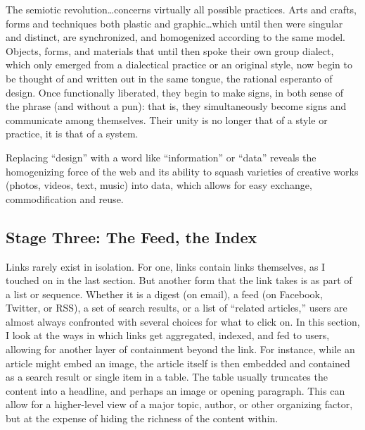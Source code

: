 The semiotic revolution…concerns virtually all possible practices. Arts and crafts, forms and techniques both plastic and graphic…which until then were singular and distinct, are synchronized, and homogenized according to the same model. Objects, forms, and materials that until then spoke their own group dialect, which only emerged from a dialectical practice or an original style, now begin to be thought of and written out in the same tongue, the rational esperanto of design. Once functionally liberated, they begin to make signs, in both sense of the phrase (and without a pun): that is, they simultaneously become  signs and communicate among themselves. Their unity is no longer that of a style or practice, it is that of a system. 

Replacing “design” with a word like “information” or “data” reveals the homogenizing force of the web and its ability to squash varieties of creative works (photos, videos, text, music) into data, which allows for easy exchange, commodification and reuse.

\subsection{Stage Three: The Feed, the Index}

Links rarely exist in isolation. For one, links contain links themselves, as I touched on in the last section. But another form that the link takes is as part of a list or sequence. Whether it is a digest (on email), a feed (on Facebook, Twitter, or RSS), a set of search results, or a list of “related articles,” users are almost always confronted with several choices for what to click on. In this section, I look at the ways in which links get aggregated, indexed, and fed to users, allowing for another layer of containment beyond the link. For instance, while an article might embed an image, the article itself is then embedded and contained as a search result or single item in a table. The table usually truncates the content into a headline, and perhaps an image or opening paragraph. This can allow for a higher-level view of a major topic, author, or other organizing factor, but at the expense of hiding the richness of the content within.

